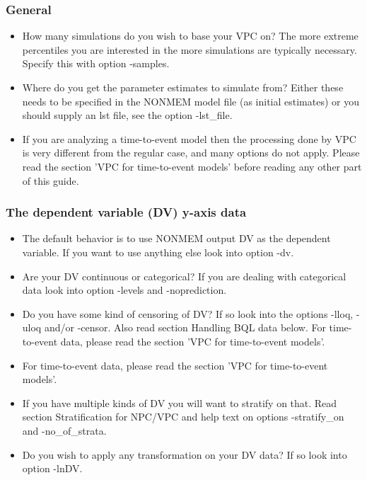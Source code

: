 \subsubsection*{General}

\begin{itemize}
	\item How many simulations do you wish to base your VPC on? The more extreme percentiles you are interested in the more simulations are typically necessary. Specify this with option -samples.
	\item Where do you get the parameter estimates to simulate from? Either these needs to be specified in the NONMEM model file (as initial estimates) or you should supply an lst file, see the option -lst\_file.
	\item If you are analyzing a time-to-event model then the processing done by VPC is very different from the regular case, and many options do not apply. Please read the section 'VPC for time-to-event models' before reading any other part of this guide.
\end{itemize}

\subsubsection*{The dependent variable (DV) y-axis data}

\begin{itemize}
	\item The default behavior is to use NONMEM output DV as the dependent variable. If you want to use anything else look into option -dv.
	\item Are your DV continuous or categorical? If you are dealing with categorical data look into option -levels and -noprediction.
	\item Do you have some kind of censoring of DV? If so look into the options -lloq, -uloq and/or -censor. Also read section Handling BQL data below. For time-to-event data, please read the section 'VPC for time-to-event models'.
	\item For time-to-event data, please read the section 'VPC for time-to-event models'.
	\item If you have multiple kinds of DV you will want to stratify on that. Read section Stratification for NPC/VPC and help text on options -stratify\_on and -no\_of\_strata.
	\item Do you wish to apply any transformation on your DV data? If so look into option -lnDV.
\end{itemize}

